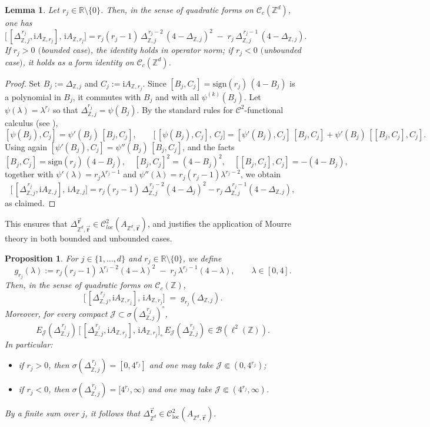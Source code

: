 \documentclass[10pt]{amsart} %
\newcommand{\R}{{\mathbb{R}}}
\newcommand{\Z}{{\mathbb{Z}}}
\newcommand{\1}{{\mathbb{I}}}
\newcommand{\Bc}{\mathcal{B}}
\newcommand{\Cc}{\mathcal{C}}
\newcommand{\Jc}{\mathcal{J}}
\numberwithin{equation}{section}
\newtheorem{proposition}[theorem]{Proposition}%
\newtheorem{lemma}[theorem]{Lemma}%
\begin{document}
\begin{lemma}\label{lem:second_comm}
Let $r_j\in\mathbb{R}\setminus\{0\}$.
Then, in the sense of quadratic forms on $\Cc_c(\Z^d)$, one has
\[
\big[\,[\Delta_{\Z,j}^{\,r_j},\mathrm{i}A_{\Z,r_j}],\,\mathrm{i}A_{\Z,r_j}\big]
= r_j(r_j-1)\,\Delta_{\Z,j}^{\,r_j-2}\,(4-\Delta_{\Z,j})^2 \;-\; r_j\,\Delta_{\Z,j}^{\,r_j-1}\,(4-\Delta_{\Z,j}).
\]
If $r_j>0$ $($bounded case$)$, the identity holds in operator norm; if $r_j<0$ $($unbounded case$)$, it holds as a form identity on $\Cc_c(\Z^d)$.
\end{lemma}

\begin{proof}
Set $B_j:=\Delta_{\Z,j}$ and $C_j:=\mathrm{i}A_{\Z,r_j}$.
Since $[B_j,C_j]=\mathrm{sign}(r_j)\,(4-B_j)$ is a polynomial in $B_j$, it commutes with $B_j$ and with all $\psi^{(k)}(B_j)$.
Let $\psi(\lambda)=\lambda^{r_j}$ so that $\Delta_{\Z,j}^{r_j}=\psi(B_j)$.
By the standard rules for $\Cc^2$-functional calculus (see \cite[Prop.~5.1.5 \& Thm.~7.2.9]{ABG}),
\[
[\psi(B_j),C_j]=\psi'(B_j)\,[B_j,C_j],
\qquad
\big[\,[\psi(B_j),C_j],\,C_j\big]=[\psi'(B_j),C_j]\,[B_j,C_j]+\psi'(B_j)\,[[B_j,C_j],C_j].
\]
Using \cite[Theorem]{ABG} again $[\psi'(B_j),C_j]=\psi''(B_j)\,[B_j,C_j]$, and the facts
\[
[B_j,C_j]=\mathrm{sign}(r_j)\,(4-B_j), \quad
[B_j,C_j]^2=(4-B_j)^2, \quad
[[B_j,C_j],C_j]=-(4-B_j),
\]
together with $\psi'(\lambda)=r_j\lambda^{r_j-1}$ and $\psi''(\lambda)=r_j(r_j-1)\lambda^{r_j-2}$, we obtain
\[
\big[\,[\Delta_{\Z,j}^{\,r_j},\mathrm{i}A_{\Z,j}],\,\mathrm{i}A_{\Z,j}\big]
= r_j(r_j-1)\,\Delta_{\Z,j}^{\,r_j-2}(4-\Delta_j)^2 - r_j\,\Delta_{\Z,j}^{\,r_j-1}(4-\Delta_{\Z,j}),
\]
as claimed.
\end{proof}
This ensures that \( \Delta_{\Z^d,\vec{\mathbf{r}}}^{\vec{\mathbf{r}}} \in \mathcal{C}_{loc}^2(A_{\Z^d,\vec{\mathbf{r}}
}) \), and justifies the application of Mourre theory in both bounded and unbounded cases.
\begin{proposition}\label{prop:double-commutator-Zd}
For $j\in\{1,\dots,d\}$ and $r_j\in\R\setminus\{0\}$, we define
\[
g_{r_j}(\lambda):=r_j(r_j-1)\,\lambda^{r_j-2}(4-\lambda)^2\;-\;r_j\,\lambda^{r_j-1}(4-\lambda),
\qquad \lambda\in[0,4].
\]
Then, in the sense of quadratic forms on $\Cc_c(\Z)$,
\[
\big[\,[\Delta_{\Z,j}^{\,r_j},\mathrm{i}A_{\Z,r_j}],\,\mathrm{i}A_{\Z,r_j}\big]
\;=\;g_{r_j}(\Delta_{\Z,j}).
\]
Moreover, for every compact $\Jc\subset\sigma(\Delta_{\Z,j}^{\,r_j})^\circ$,
\[
E_\Jc(\Delta_{\Z,j}^{\,r_j})\,
\big[\,[\Delta_{\Z,j}^{\,r_j},\mathrm{i}A_{\Z,r_j}],\,\mathrm{i}A_{\Z,r_j}\big]_{\circ}\,
E_\Jc(\Delta_{\Z,j}^{\,r_j})\in\Bc(\ell^2(\Z)).
\]
In particular:
\begin{itemize}
\item if $r_j>0$, then $\sigma(\Delta_{\Z,j}^{\,r_j})=[0,4^{r_j}]$ and one may take $\Jc\Subset (0,4^{r_j})$;
\item if $r_j<0$, then $\sigma(\Delta_{\Z,j}^{\,r_j})=[4^{r_j},\infty)$ and one may take $\Jc\Subset (4^{r_j},\infty)$.
\end{itemize}
By a finite sum over $j$, it follows that
\(
\Delta_{\Z^d}^{\vec{\mathbf{r}}}\in \Cc^2_{\mathrm{loc}}(A_{\Z^d,\vec{\mathbf{r}}}).
\)
\end{proposition}
\end{document}
